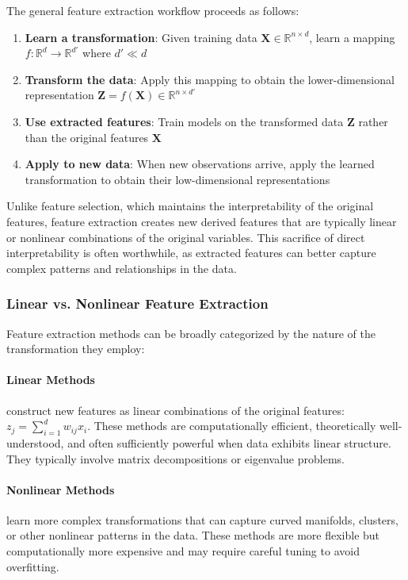 The general feature extraction workflow proceeds as follows:
\begin{enumerate}
\item \textbf{Learn a transformation}: Given training data $\mathbf{X} \in \mathbb{R}^{n \times d}$, learn a mapping $f: \mathbb{R}^d \to \mathbb{R}^{d'}$ where $d' \ll d$
\item \textbf{Transform the data}: Apply this mapping to obtain the lower-dimensional representation $\mathbf{Z} = f(\mathbf{X}) \in \mathbb{R}^{n \times d'}$
\item \textbf{Use extracted features}: Train models on the transformed data $\mathbf{Z}$ rather than the original features $\mathbf{X}$
\item \textbf{Apply to new data}: When new observations arrive, apply the learned transformation to obtain their low-dimensional representations
\end{enumerate}

Unlike feature selection, which maintains the interpretability of the original features, feature extraction creates new derived features that are typically linear or nonlinear combinations of the original variables. This sacrifice of direct interpretability is often worthwhile, as extracted features can better capture complex patterns and relationships in the data.

\subsubsection*{Linear vs. Nonlinear Feature Extraction}

Feature extraction methods can be broadly categorized by the nature of the transformation they employ:

\paragraph{Linear Methods} construct new features as linear combinations of the original features: $z_j = \sum_{i=1}^d w_{ij} x_i$. These methods are computationally efficient, theoretically well-understood, and often sufficiently powerful when data exhibits linear structure. They typically involve matrix decompositions or eigenvalue problems.

\paragraph{Nonlinear Methods} learn more complex transformations that can capture curved manifolds, clusters, or other nonlinear patterns in the data. These methods are more flexible but computationally more expensive and may require careful tuning to avoid overfitting.

